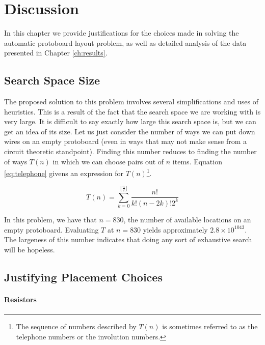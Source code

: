 
\chapter{Discussion}
\label{ch:discussion}

In this chapter we provide justifications for the choices made in solving the
automatic protoboard layout problem, as well as detailed analysis of the data
presented in Chapter \ref{ch:results}.

\section{Search Space Size}
\label{sec:search_space_size}

The proposed solution to this problem involves several simplifications and uses
of heuristics. This is a result of the fact that the search space we are working
with is very large. It is difficult to say exactly how large this search space
is, but we can get an idea of its size. Let us just consider the number of ways
we can put down wires on an empty protoboard (even in ways that may not make
sense
from a circuit theoretic standpoint). Finding this number reduces to finding the
number of ways $T(n)$ in which we can choose pairs out of $n$ items. Equation
\ref{eq:telephone} givens an expression for $T(n)$\footnote{The sequence of
numbers described by $T(n)$ is sometimes referred to as the telephone numbers
or the involution numbers.}.

\begin{equation}
T(n) = \sum_{k = 0}^{\lfloor \frac{n}{2} \rfloor}{\frac{n!}{k! (n - 2k)! 2^k}}
\label{eq:telephone}
\end{equation}

In this problem, we have that $n = 830$, the number of available locations on an
empty protoboard. Evaluating $T$ at $n = 830$ yields approximately
$2.8\times10^{1043}$.
The largeness of this number indicates that doing any sort of exhaustive search
will be hopeless.

\section{Justifying Placement Choices}
\label{sec:justify_placement}

\subsubsection{Resistors}

